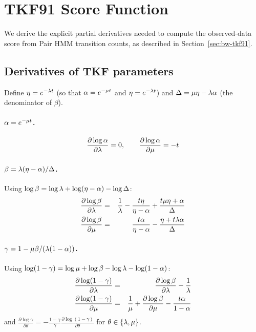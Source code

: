 
\section{TKF91 Score Function}
\label{sec:appendix-score}

We derive the explicit partial derivatives needed to compute the observed-data score
from Pair HMM transition counts, as described in Section~\ref{sec:bw-tkf91}.

\subsection{Derivatives of TKF parameters}

Define $\eta = e^{-\lambda t}$ (so that $\alpha = e^{-\mu t}$ and $\eta = e^{-\lambda t}$)
and $\Delta = \mu\eta - \lambda\alpha$ (the denominator of $\beta$).

\paragraph{$\alpha = e^{-\mu t}$.}
\[
\frac{\partial \log\alpha}{\partial \lambda} = 0, \qquad
\frac{\partial \log\alpha}{\partial \mu} = -t
\]

\paragraph{$\beta = \lambda(\eta - \alpha)/\Delta$.}
Using $\log\beta = \log\lambda + \log(\eta - \alpha) - \log\Delta$:
\begin{eqnarray*}
\frac{\partial \log\beta}{\partial \lambda} & = & \frac{1}{\lambda} - \frac{t\eta}{\eta - \alpha} + \frac{t\mu\eta + \alpha}{\Delta} \\
\frac{\partial \log\beta}{\partial \mu} & = & \frac{t\alpha}{\eta - \alpha} - \frac{\eta + t\lambda\alpha}{\Delta}
\end{eqnarray*}

\paragraph{$\gamma = 1 - \mu\beta/(\lambda(1-\alpha))$.}
Using $\log(1-\gamma) = \log\mu + \log\beta - \log\lambda - \log(1-\alpha)$:
\begin{eqnarray*}
\frac{\partial \log(1-\gamma)}{\partial \lambda} & = & \frac{\partial\log\beta}{\partial\lambda} - \frac{1}{\lambda} \\
\frac{\partial \log(1-\gamma)}{\partial \mu} & = & \frac{1}{\mu} + \frac{\partial\log\beta}{\partial\mu} - \frac{t\alpha}{1-\alpha}
\end{eqnarray*}
and $\frac{\partial\log\gamma}{\partial\theta} = -\frac{1-\gamma}{\gamma}\frac{\partial\log(1-\gamma)}{\partial\theta}$ for $\theta \in \{\lambda,\mu\}$.

